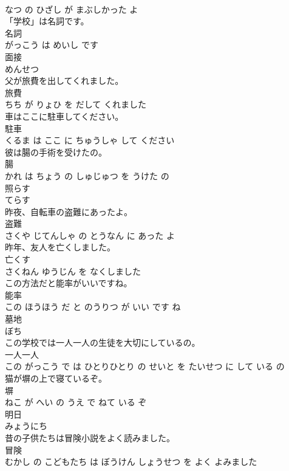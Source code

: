 \documentclass[8pt]{extreport}
\begin{document}
\begin{CJK}{UTF8}{min}
\\	なつ の ひざし が まぶしかった よ			
\\	「学校」は名詞です。	
\\	名詞 
\\	がっこう は めいし です			
\\	面接	
\\	めんせつ			
\\	父が旅費を出してくれました。	
\\	旅費 
\\	ちち が りょひ を だして くれました			
\\	車はここに駐車してください。	
\\	駐車 
\\	くるま は ここ に ちゅうしゃ して ください			
\\	彼は腸の手術を受けたの。	
\\	腸 
\\	かれ は ちょう の しゅじゅつ を うけた の			
\\	照らす	
\\	てらす			
\\	昨夜、自転車の盗難にあったよ。	
\\	盗難 
\\	さくや じてんしゃ の とうなん に あった よ			
\\	昨年、友人を亡くしました。	
\\	亡くす 
\\	さくねん ゆうじん を なくしました			
\\	この方法だと能率がいいですね。	
\\	能率 
\\	この ほうほう だ と のうりつ が いい です ね			
\\	墓地	
\\	ぼち			
\\	この学校では一人一人の生徒を大切にしているの。	
\\	一人一人 
\\	この がっこう で は ひとりひとり の せいと を たいせつ に して いる の			
\\	猫が塀の上で寝ているぞ。	
\\	塀 
\\	ねこ が へい の うえ で ねて いる ぞ			
\\	明日	
\\	みょうにち			
\\	昔の子供たちは冒険小説をよく読みました。	
\\	冒険 
\\	むかし の こどもたち は ぼうけん しょうせつ を よく よみました			

\end{CJK}
\end{document}

